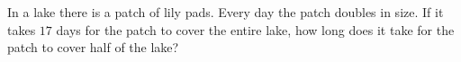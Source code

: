 In a lake there is a patch of lily pads. Every day the patch doubles in size. If it takes $17$ days for the patch to cover the entire lake, how long does it take for the patch to cover half of the lake?
